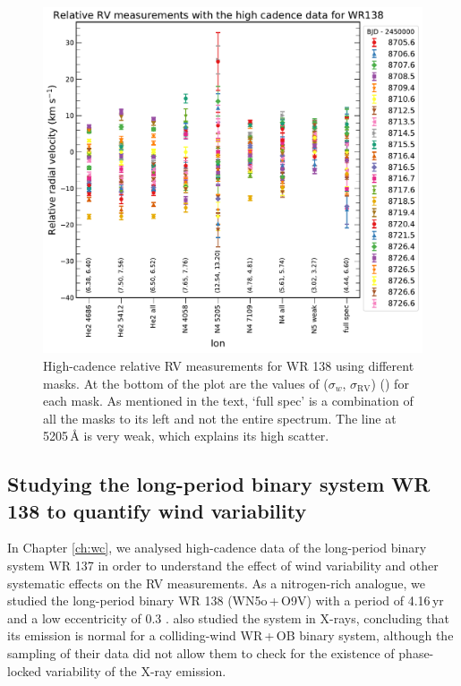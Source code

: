 \begin{figure}[t]
    \centering
    \includegraphics[width=\textwidth]{chapters/WNE/image/RV_SC_ions_nogrid.pdf}
    \caption{High-cadence relative RV measurements for WR 138 using different masks. At the bottom of the plot are the values of ($\sigma_w$, $\sigma_{\textrm{RV}}$) (\kms{}) for each mask. As mentioned in the text, `full spec' is a combination of all the masks to its left and not the entire spectrum. The \niv{} line at 5205\,\r{A} is very weak, which explains its high scatter.}
    \label{fig:sc_ions}
\end{figure}
\subsection{Studying the long-period binary system WR 138 to quantify wind variability} \label{sect:windVariability}

In Chapter \ref{ch:wc}, we analysed high-cadence data of the long-period binary system WR 137 in order to understand the effect of wind variability and other systematic effects on the RV measurements. As a nitrogen-rich analogue, we studied the long-period binary WR 138 (WN5o\,+\,O9V) with a period of 4.16\,yr and a low eccentricity of 0.3 \citep{2013Palate,1990Annuk,2016Richardson}. \citet{2013Palate} also studied the system in X-rays, concluding that its emission is normal for a colliding-wind WR\,+\,OB binary system, although the sampling of their data did not allow them to check for the existence of phase-locked variability of the X-ray emission.

